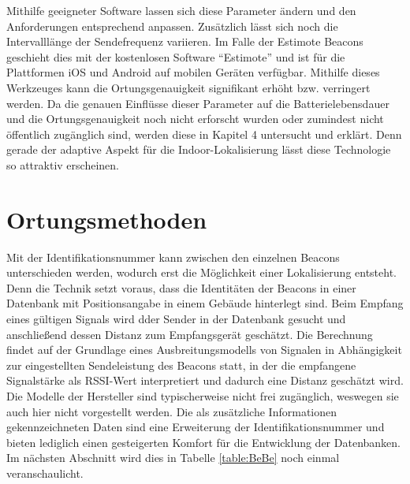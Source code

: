 Mithilfe geeigneter Software lassen sich diese Parameter ändern und den Anforderungen entsprechend anpassen. Zusätzlich lässt sich noch die Intervalllänge der Sendefrequenz variieren. Im Falle der Estimote Beacons geschieht dies mit der kostenlosen Software "`Estimote"' und ist für die Plattformen iOS und Android auf mobilen Geräten verfügbar. Mithilfe dieses Werkzeuges kann die Ortungsgenauigkeit signifikant erhöht bzw. verringert werden. Da die genauen Einflüsse dieser Parameter auf die Batterielebensdauer und die Ortungsgenauigkeit noch nicht erforscht wurden oder zumindest nicht öffentlich zugänglich sind, werden diese in Kapitel 4 untersucht und erklärt. Denn gerade der adaptive Aspekt für die Indoor-Lokalisierung lässt diese Technologie so attraktiv erscheinen.
\section{Ortungsmethoden}
Mit der Identifikationsnummer kann zwischen den einzelnen Beacons unterschieden werden, wodurch erst die Möglichkeit einer Lokalisierung entsteht. Denn die Technik setzt voraus, dass die Identitäten der Beacons in einer Datenbank mit Positionsangabe in einem Gebäude hinterlegt sind. Beim Empfang eines gültigen Signals wird dder Sender in der Datenbank gesucht und anschließend dessen Distanz zum Empfangsgerät geschätzt. Die Berechnung findet auf der Grundlage eines Ausbreitungsmodells von Signalen in Abhängigkeit zur eingestellten Sendeleistung des Beacons statt, in der die empfangene Signalstärke als RSSI-Wert interpretiert und dadurch eine Distanz geschätzt wird. Die Modelle der Hersteller sind typischerweise nicht frei zugänglich, weswegen sie auch hier nicht vorgestellt werden. Die als zusätzliche Informationen gekennzeichneten Daten sind eine Erweiterung der Identifikationsnummer und bieten lediglich einen gesteigerten Komfort für die Entwicklung der Datenbanken. Im nächsten Abschnitt wird dies in Tabelle \ref{table:BeBe} noch einmal veranschaulicht.\\
